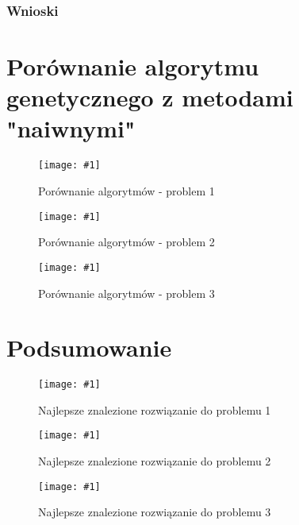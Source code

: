 \documentclass[12pt,a4paper]{article}
\newcommand{\image}[2] {
    \begin{figure}[H]
        \begin{center}
            \texttt{[image: \#1]}
        \end{center}
        \caption{#2}
        \label{#1}
    \end{figure}
}
\begin{document}
\subsubsection{Wnioski}
\section{Porównanie algorytmu genetycznego z metodami "naiwnymi"}
\image{images/Porównanie algorytmów_1}{Porównanie algorytmów - problem 1}
\image{images/Porównanie algorytmów_2}{Porównanie algorytmów - problem 2}
\image{images/Porównanie algorytmów_3}{Porównanie algorytmów - problem 3}

\section{Podsumowanie}
\image{images/solution1}{Najlepsze znalezione rozwiązanie do problemu 1}
\image{images/solution2}{Najlepsze znalezione rozwiązanie do problemu 2}
\image{images/solution3}{Najlepsze znalezione rozwiązanie do problemu 3}
\end{document}
